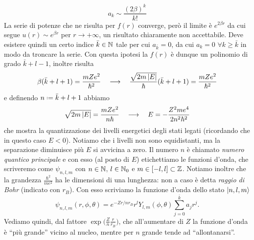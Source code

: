 \begin{equation}
	a_k\sim\frac{(2\beta)^k}{k!}
\end{equation}
La serie di potenze che ne risulta per $f(r)$ converge, però il limite è $e^{2\beta r}$ da cui segue $u(r)\sim e^{\beta r}$ per $r\to+\infty$, un risultato chiaramente non accettabile.
Deve esistere quindi un certo indice $\bar{k}\in\mathbb{N}$ tale per cui $a_{\bar{k}}=0$, da cui $a_k=0$ $\forall k\ge\bar{k}$ in modo da troncare la serie.
Con questa ipotesi la $f(r)$ è dunque un polinomio di grado $\bar{k}+l-1$, inoltre risulta
\begin{equation}
	\beta(\bar{k}+l+1)=\frac{mZe^2}{\hbar^2}\quad\longrightarrow\quad\frac{\sqrt{2m\left|{E}\right|}}{\hbar}(\bar{k}+l+1)=\frac{mZe^2}{\hbar^2}
\end{equation}
e definendo $n\defeq\bar{k}+l+1$ abbiamo
\begin{equation}
	\sqrt{2m\left|{E}\right|}=\frac{mZe^2}{n\hbar}\quad\longrightarrow\quad E=-\frac{Z^2me^4}{2n^2\hbar^2}
\end{equation}
che mostra la quantizzazione dei livelli energetici degli stati legati (ricordando che in questo caso $E<0$).
Notiamo che i livelli non sono equidistanti, ma la separazione diminuisce più $E$ si avvicina a zero.
Il numero $n$ è chiamato \emph{numero quantico principale} e con esso (al posto di $E$) etichettiamo le funzioni d'onda, che scriveremo come $\psi_{n,l,m}$ con $n\in\mathbb{N}$, $l\in\mathbb{N}_0$ e $m\in[-l,l]\subset\mathbb{Z}$.
Notiamo inoltre che la grandezza $\frac{\hbar^2}{me^2}$ ha le dimensioni di una lunghezza: non a caso è detta \emph{raggio di Bohr} (indicato con $r_B$).
Con esso scriviamo la funzione d'onda dello stato $\left|{n,l,m}\right\rangle$
\begin{equation}
	\psi_{n,l,m}(r,\phi,\theta)=e^{-Zr/nr_B}r^lY_{l,m}(\phi,\theta)\sum_{j=0}^{\bar{k}}a_jr^j.
	\label{eq:wf-idrogeno}
\end{equation}
Vediamo quindi, dal fattore $\exp\big(\frac{Z}{n}\frac{r}{r_B}\big)$, che all'aumentare di $Z$ la funzione d'onda è ``più grande'' vicino al nucleo, mentre per $n$ grande tende ad ``allontanarsi''.

